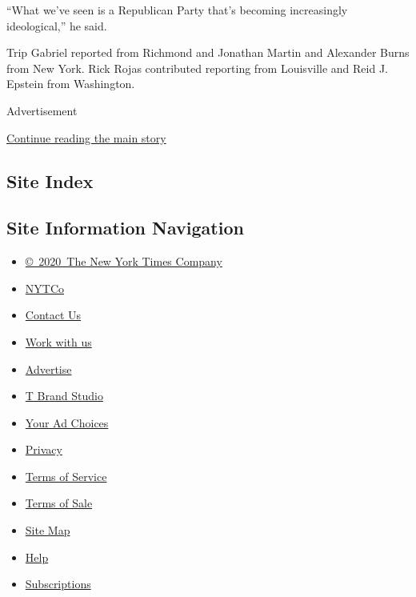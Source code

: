 ``What we've seen is a Republican Party that's becoming increasingly
ideological,'' he said.

Trip Gabriel reported from Richmond and Jonathan Martin and Alexander
Burns from New York. Rick Rojas contributed reporting from Louisville
and Reid J. Epstein from Washington.

Advertisement

\protect\hyperlink{after-bottom}{Continue reading the main story}

\hypertarget{site-index}{%
\subsection{Site Index}\label{site-index}}

\hypertarget{site-information-navigation}{%
\subsection{Site Information
Navigation}\label{site-information-navigation}}

\begin{itemize}
\tightlist
\item
  \href{https://help.nytimes3xbfgragh.onion/hc/en-us/articles/115014792127-Copyright-notice}{©~2020~The
  New York Times Company}
\end{itemize}

\begin{itemize}
\tightlist
\item
  \href{https://www.nytco.com/}{NYTCo}
\item
  \href{https://help.nytimes3xbfgragh.onion/hc/en-us/articles/115015385887-Contact-Us}{Contact
  Us}
\item
  \href{https://www.nytco.com/careers/}{Work with us}
\item
  \href{https://nytmediakit.com/}{Advertise}
\item
  \href{http://www.tbrandstudio.com/}{T Brand Studio}
\item
  \href{https://www.nytimes3xbfgragh.onion/privacy/cookie-policy\#how-do-i-manage-trackers}{Your
  Ad Choices}
\item
  \href{https://www.nytimes3xbfgragh.onion/privacy}{Privacy}
\item
  \href{https://help.nytimes3xbfgragh.onion/hc/en-us/articles/115014893428-Terms-of-service}{Terms
  of Service}
\item
  \href{https://help.nytimes3xbfgragh.onion/hc/en-us/articles/115014893968-Terms-of-sale}{Terms
  of Sale}
\item
  \href{https://spiderbites.nytimes3xbfgragh.onion}{Site Map}
\item
  \href{https://help.nytimes3xbfgragh.onion/hc/en-us}{Help}
\item
  \href{https://www.nytimes3xbfgragh.onion/subscription?campaignId=37WXW}{Subscriptions}
\end{itemize}
